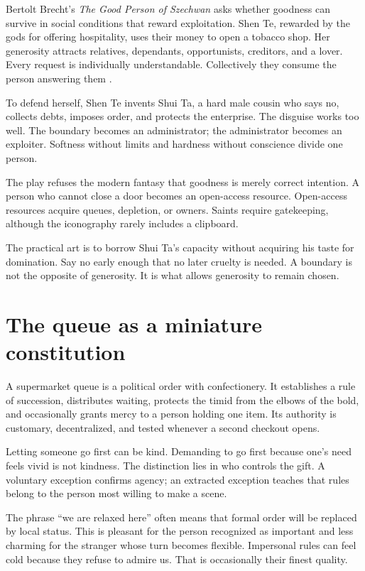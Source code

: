 \documentclass[12pt,a4paper]{book}
\begin{document}
Bertolt Brecht's \emph{The Good Person of Szechwan} asks whether goodness can
survive in social conditions that reward exploitation.  Shen Te, rewarded by
the gods for offering hospitality, uses their money to open a tobacco shop.
Her generosity attracts relatives, dependants, opportunists, creditors, and a
lover.  Every request is individually understandable.  Collectively they
consume the person answering them \cite{Brecht-GMvS}.

To defend herself, Shen Te invents Shui Ta, a hard male cousin who says no,
collects debts, imposes order, and protects the enterprise.  The disguise
works too well.  The boundary becomes an administrator; the administrator
becomes an exploiter.  Softness without limits and hardness without conscience
divide one person.

The play refuses the modern fantasy that goodness is merely correct intention.
A person who cannot close a door becomes an open-access resource.  Open-access
resources acquire queues, depletion, or owners.  Saints require gatekeeping,
although the iconography rarely includes a clipboard.

The practical art is to borrow Shui Ta's capacity without acquiring his taste
for domination.  Say no early enough that no later cruelty is needed.  A
boundary is not the opposite of generosity.  It is what allows generosity to
remain chosen.

\section{The queue as a miniature constitution}

A supermarket queue is a political order with confectionery.  It establishes
a rule of succession, distributes waiting, protects the timid from the elbows
of the bold, and occasionally grants mercy to a person holding one item.  Its
authority is customary, decentralized, and tested whenever a second checkout
opens.

Letting someone go first can be kind.  Demanding to go first because one's need
feels vivid is not kindness.  The distinction lies in who controls the gift.
A voluntary exception confirms agency; an extracted exception teaches that
rules belong to the person most willing to make a scene.

The phrase ``we are relaxed here'' often means that formal order will be
replaced by local status.  This is pleasant for the person recognized as
important and less charming for the stranger whose turn becomes flexible.
Impersonal rules can feel cold because they refuse to admire us.  That is
occasionally their finest quality.
\end{document}

